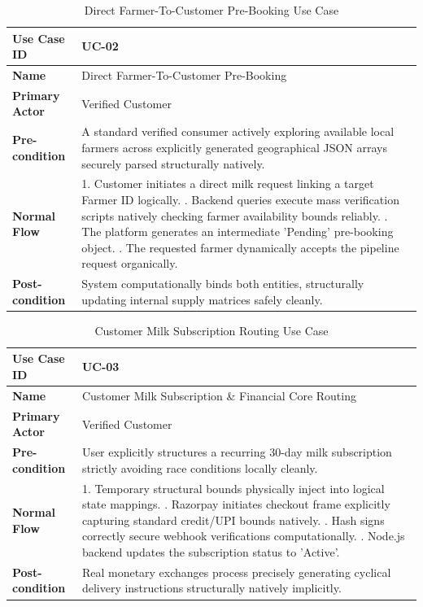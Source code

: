 \documentclass[12pt,a4paper]{report}
\begin{document}
\vspace{0.4cm}
\begin{table}[htbp]
\centering
\begin{tabular}{|p{3cm}|p{11cm}|}
\hline
\textbf{Use Case ID} & UC-02 \\ \hline
\textbf{Name} & Direct Farmer-To-Customer Pre-Booking \\ \hline
\textbf{Primary Actor} & Verified Customer \\ \hline
\textbf{Pre-condition} & A standard verified consumer actively exploring available local farmers across explicitly generated geographical JSON arrays securely parsed structurally natively. \\ \hline
\textbf{Normal Flow} & 1. Customer initiates a direct milk request linking a target Farmer ID logically. \newline 2. Backend queries execute mass verification scripts natively checking farmer availability bounds reliably. \newline 3. The platform generates an intermediate 'Pending' pre-booking object. \newline 4. The requested farmer dynamically accepts the pipeline request organically. \\ \hline
\textbf{Post-condition} & System computationally binds both entities, structurally updating internal supply matrices safely cleanly. \\ \hline
\end{tabular}
\caption{Direct Farmer-To-Customer Pre-Booking Use Case}
\end{table}
\vspace{0.4cm}

\vspace{0.4cm}
\begin{table}[htbp]
\centering
\begin{tabular}{|p{3cm}|p{11cm}|}
\hline
\textbf{Use Case ID} & UC-03 \\ \hline
\textbf{Name} & Customer Milk Subscription \& Financial Core Routing \\ \hline
\textbf{Primary Actor} & Verified Customer \\ \hline
\textbf{Pre-condition} & User explicitly structures a recurring 30-day milk subscription strictly avoiding race conditions locally cleanly. \\ \hline
\textbf{Normal Flow} & 1. Temporary structural bounds physically inject into logical state mappings. \newline 2. Razorpay initiates checkout frame explicitly capturing standard credit/UPI bounds natively. \newline 3. Hash signs correctly secure webhook verifications computationally. \newline 4. Node.js backend updates the subscription status to 'Active'. \\ \hline
\textbf{Post-condition} & Real monetary exchanges process precisely generating cyclical delivery instructions structurally natively implicitly. \\ \hline
\end{tabular}
\caption{Customer Milk Subscription Routing Use Case}
\end{table}
\vspace{0.4cm}
\end{document}
